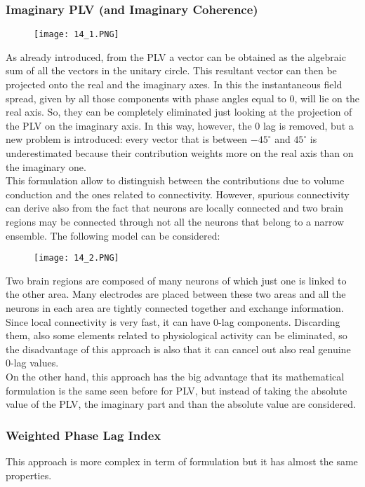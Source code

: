 \subsubsection{Imaginary PLV (and Imaginary Coherence)} 
\begin{figure}[H]
    \centering
    \texttt{[image: 14\_1.PNG]}
\end{figure}
As already introduced, from the PLV a vector can be obtained as the algebraic sum of all the vectors in the unitary circle. This resultant vector can then be projected onto the real and the imaginary axes. 
In this the instantaneous field spread, given by all those components with phase angles equal to 0, will lie on the real axis. So, they can be completely eliminated just looking at the projection of the PLV on the imaginary axis.
In this way, however, the 0 lag is removed, but a new problem is introduced: every vector that is between \(-45^\circ\) and \(45^\circ\) is underestimated because their contribution weights more on the real axis than on the imaginary one.\\
This formulation allow to distinguish between the contributions due to volume conduction and the ones related to connectivity. However, spurious connectivity can derive also from the fact that neurons are locally connected and two brain regions may be connected through not all the neurons that belong to a narrow ensemble.
The following model can be considered:
\begin{figure}[H]
    \centering
    \texttt{[image: 14\_2.PNG]}
\end{figure}
Two brain regions are composed of many neurons of which just one is linked to the other area. Many electrodes are placed between these two areas and all the neurons in each area are tightly connected together and exchange information.
Since local connectivity is very fast, it can have 0-lag components. Discarding them, also some elements related to physiological activity can be eliminated, so the disadvantage of this approach is also that it can cancel out also real genuine 0-lag values.\\
On the other hand, this approach has the big advantage that its mathematical formulation is the same seen before for PLV, but instead of taking the absolute value of the PLV, the imaginary part and than the absolute value are considered.
\subsubsection{Weighted Phase Lag Index}
This approach is more complex in term of formulation but it has almost the same properties.
